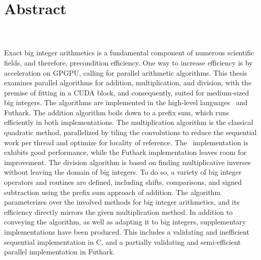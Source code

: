 \thispagestyle{empty}
{\centering
  \section*{Abstract}
}
\label{sec:abstract}
\hfill\\\\

Exact big integer arithmetics is a fundamental component of numerous scientific
fields, and therefore, precondition efficiency. One way to increase efficiency
is by acceleration on GPGPU, calling for parallel arithmetic algorithms. This
thesis examines parallel algorithms for addition, multiplication, and division,
with the premise of fitting in a CUDA block, and consequently, suited for
medium-sized big integers. The algorithms are implemented in the high-level
languages \cpp\ and Futhark. The addition algorithm boils down to a prefix sum,
which runs efficiently in both implementations. The multiplication algorithm is
the classical quadratic method, parallelized by tiling the convolutions to
reduce the sequential work per thread and optimize for locality of
reference. The \cpp\ implementation is exhibits good performance, while the
Futhark implementation leaves room for improvement. The division algorithm is
based on finding multiplicative inverses without leaving the domain of big
integers. To do so, a variety of big integer operators and routines are defined,
including shifts, comparisons, and signed subtraction using the prefix sum
approach of addition. The algorithm parameterizes over the involved methods for
big integer arithmetics, and its efficiency directly mirrors the given
multiplication method. In addition to conveying the algorithm, as well as
adapting it to big integers, supplementary implementations have been
produced. This includes a validating and inefficient sequential implementation
in C, and a partially validating and semi-efficient parallel implementation in
Futhark.

\restoregeometry

